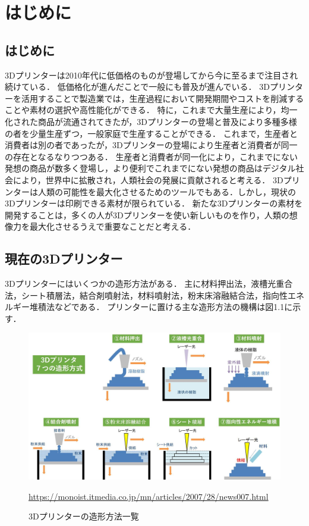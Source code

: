 \chapter{はじめに}
\label{chp:first}

\section{はじめに}
\label{sec:paragraph}

3Dプリンターは2010年代に低価格のものが登場してから今に至るまで注目され続けている．
低価格化が進んだことで一般にも普及が進んでいる．
3Dプリンターを活用することで製造業では，生産過程において開発期間やコストを削減することや素材の選択や高性能化ができる．
特に，これまで大量生産により，均一化された商品が流通されてきたが，3Dプリンターの登場と普及により多種多様の者を少量生産ずつ，一般家庭で生産することができる．
これまで，生産者と消費者は別の者であったが，3Dプリンターの登場により生産者と消費者が同一の存在となるなりつつある． 
生産者と消費者が同一化により，これまでにない発想の商品が数多く登場し，より便利でこれまでにない発想の商品はデジタル社会により，世界中に拡散され，人類社会の発展に貢献されると考える．
3Dプリンターは人類の可能性を最大化させるためのツールでもある．しかし，現状の3Dプリンターは印刷できる素材が限られている．
新たな3Dプリンターの素材を開発することは，多くの人が3Dプリンターを使い新しいものを作り，人類の想像力を最大化させるうえで重要なことだと考える．


\section{現在の3Dプリンター}
\label{sec:paragraph}

3Dプリンターにはいくつかの造形方法がある．
主に材料押出法，液槽光重合法，シート積層法，結合剤噴射法，材料噴射法，粉末床溶融結合法，指向性エネルギー堆積法などである．
プリンターに置ける主な造形方法の機構は図1.1に示す．

\begin{figure}[H]
  \centering
  \includegraphics[width=15truecm]{./fig/3Dprinter.jpg}
  \caption{3Dプリンターの造形方法一覧}
  \url{https://monoist.itmedia.co.jp/mn/articles/2007/28/news007.html} %
  \label{fig:ゲル}
\end{figure}

